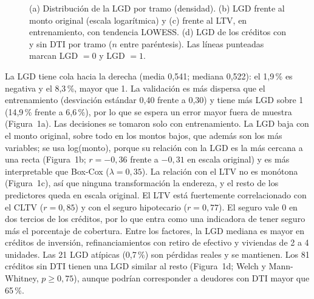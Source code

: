 \begin{figure}[H]
  \centering
  \caption{(a) Distribución de la LGD por tramo (densidad). (b) LGD frente al monto original
  (escala logarítmica) y (c) frente al LTV, en entrenamiento, con tendencia LOWESS. (d) LGD de
  los créditos con y sin DTI por tramo ($n$ entre paréntesis). Las líneas punteadas marcan
  LGD $= 0$ y LGD $= 1$.}
\end{figure}

La LGD tiene cola hacia la derecha (media 0,541; mediana 0,522): el 1,9\,\% es negativa y el
8,3\,\%, mayor que 1. La validación es más dispersa que el entrenamiento (desviación estándar
0,40 frente a 0,30) y tiene más LGD sobre 1 (14,9\,\% frente a 6,6\,\%), por lo que se espera
un error mayor fuera de muestra (Figura~1a). Las decisiones se tomaron solo con entrenamiento.
La LGD baja con el monto original, sobre todo en los montos bajos, que además son los más
variables; se usa log(monto), porque su relación con la LGD es la más cercana a una recta
(Figura~1b; $r = -0{,}36$ frente a $-0{,}31$ en escala original) y es más interpretable que
Box-Cox ($\lambda = 0{,}35$). La relación con el LTV no es monótona (Figura~1c), así que ninguna
transformación la endereza, y el resto de los predictores queda en escala original. El LTV está
fuertemente correlacionado con el CLTV ($r = 0{,}85$) y con el seguro hipotecario ($r = 0{,}77$).
El seguro vale 0 en dos tercios de los créditos, por lo que entra como una indicadora de tener
seguro más el porcentaje de cobertura. Entre los factores, la LGD mediana es mayor en créditos
de inversión, refinanciamientos con retiro de efectivo y viviendas de 2 a 4 unidades. Las 21 LGD
atípicas (0,7\,\%) son pérdidas reales y se mantienen. Los 81 créditos sin DTI tienen una LGD
similar al resto (Figura~1d; Welch y Mann-Whitney, $p \geq 0{,}75$), aunque podrían
corresponder a deudores con DTI mayor que 65\,\%.
